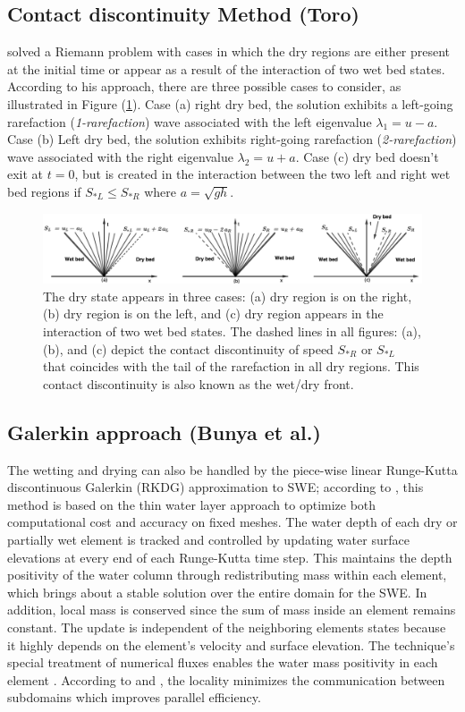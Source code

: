 \documentclass[10pt,a4paper]{article}
\newcommand{\Fig}[1]{Figure (\ref{fig:#1})}
\begin{document}
	\subsection{Contact discontinuity  Method (Toro)}
	\citet{toro2001shock} solved a Riemann problem with cases in which the dry regions are either present at the initial time or appear as a result of the interaction of two wet bed states. According to his approach, there are three possible cases to consider, as illustrated in \Fig{dry-wet}. Case (a) right dry bed, the solution exhibits a left-going rarefaction ({\em 1-rarefaction}) wave associated with the left eigenvalue $\lambda_1 = u - a$. Case (b) Left dry bed, the solution exhibits right-going rarefaction ({\em 2-rarefaction}) wave associated with the right eigenvalue $\lambda_2 = u + a$. Case (c) dry bed doesn't exit at $t=0$, but is created in the interaction between the two left and right wet bed regions if $S_{*L} \le S_{*R}$ where $a = \sqrt{gh}$.
	\begin{figure}[H]
		\centering
		\includegraphics[width=.9\linewidth]{images/dry-wet}
		\caption{The dry state appears in three cases: (a) dry region is on the right, (b) dry region is on the left, and (c) dry region appears in the interaction of two wet bed states. The dashed lines in all figures: (a), (b), and (c) depict the contact discontinuity of speed $S_{*R}$ or $S_{*L}$ that coincides with the tail of the rarefaction in all dry regions. This contact discontinuity is also known as the wet/dry front.}
		\label{fig:dry-wet}
	\end{figure}
	
	
	
	\subsection{Galerkin approach (Bunya et al.)}  
	The wetting and drying can also be handled by the piece-wise linear Runge-Kutta discontinuous Galerkin (RKDG)  approximation  to SWE;  according to   \citet{bu-ku-we-da:2009}, this method is based on the thin water layer approach to optimize both computational cost and accuracy on fixed meshes. The water depth of each dry or partially wet element is tracked and controlled by updating water surface elevations at every end of each Runge-Kutta time step. This maintains the depth positivity of the water column through redistributing mass within each element, which brings about a stable solution over the entire domain for the SWE. In addition, local mass is conserved since the sum of mass inside an element remains constant. The update is independent of the neighboring elements states because it highly depends on the element's velocity and surface elevation. The technique's special treatment of numerical fluxes enables the water mass positivity in each element  \citep{bu-ku-we-da:2009,kubatko2007semi}. According to   \citet{bokhove2005flooding} and \citet{bu-ku-we-da:2009}, the locality minimizes the communication between subdomains which improves parallel efficiency. 
	
\end{document}
